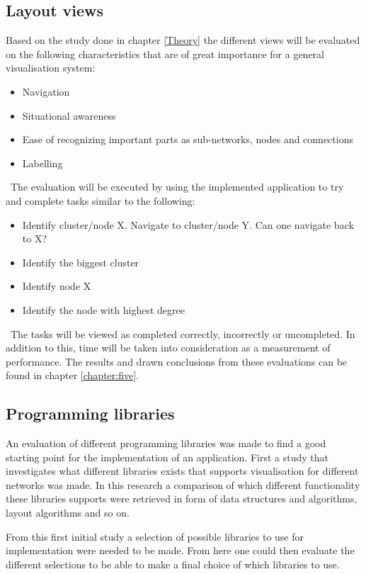 \documentclass[a4paper,11pt]{kth-mag}
\begin{document}
\subsection{Layout views}
\label{sec:evaluation:layoutviews}
Based on the study done in chapter \ref{Theory} the different views will be evaluated on the following characteristics that are of great importance for a general visualisation system:\
\begin{itemize}
	\item{Navigation}
	\item{Situational awareness}
	\item{Ease of recognizing important parts as sub-networks, nodes and connections}
	\item{Labelling}
\end{itemize}
\
The evaluation will be executed by using the implemented application to try and complete tasks similar to the following:\
\begin{itemize}
	\item{Identify cluster/node X. Navigate to cluster/node Y. Can one navigate back to X?}
	\item{Identify the biggest cluster}
	\item{Identify node X}
	\item{Identify the node with highest degree}
\end{itemize}
\
The tasks will be viewed as completed correctly, incorrectly or uncompleted. In addition to this, time will be taken into consideration as a measurement of performance. The results and drawn conclusions from these evaluations
can be found in chapter \ref{chapter:five}.
\subsection{Programming libraries}
\label{sec:evaluation:libraries}
An evaluation of different programming libraries was made to find a good starting point for the implementation of an application. First a study that investigates what different libraries exists that supports visualisation 
for different networks was made. In this research a comparison of which different functionality these libraries supports were retrieved in form of data structures and algorithms, layout algorithms and so on.

From this first initial study a selection of possible libraries to use for implementation were needed to be made. From here one could then evaluate the different selections to be able to make a final choice
 of which libraries to use.
\end{document}
